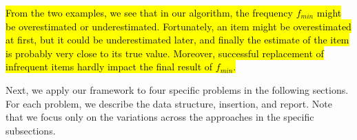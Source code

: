 \hl{
From the two examples, we see that in our algorithm, the frequency $f_{min}$ might be overestimated or underestimated.
Fortunately, an item might be overestimated at first, but it could be underestimated later, and finally the estimate of the item is probably very close to its true value.
Moreover, successful replacement of infrequent items hardly impact the final result of $f_{min}$.
}


Next, we apply our framework to four specific problems in the following sections.
{
\color{reviewD}
For each problem, we describe the data structure, insertion, and report. Note that we focus only on the variations across the approaches in the specific subsections.
}


